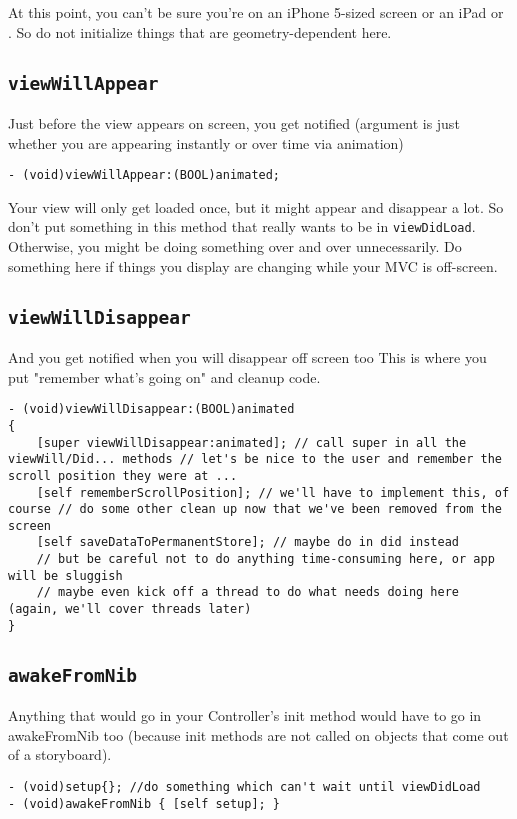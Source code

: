 \documentclass[12pt]{article}
\newcommand{\co}{\texttt}
\begin{document}
At this point, you can't be sure you're on an iPhone 5-sized screen or an iPad or . So do not initialize things that are geometry-dependent here.

\subsection{\co{viewWillAppear}}
Just before the view appears on screen, you get notified (argument is just whether you are appearing instantly or over time via animation)
\begin{lstlisting}
- (void)viewWillAppear:(BOOL)animated;
\end{lstlisting}
Your view will only get loaded once, but it might appear and disappear a lot. So don't put something in this method that really wants to be in \co{viewDidLoad}. Otherwise, you might be doing something over and over unnecessarily. Do something here if things you display are changing while your MVC is off-screen.

\subsection{\co{viewWillDisappear}}
And you get notified when you will disappear off screen too This is where you put "remember what's going on" and cleanup code.
\begin{lstlisting}
- (void)viewWillDisappear:(BOOL)animated
{
	[super viewWillDisappear:animated]; // call super in all the viewWill/Did... methods // let's be nice to the user and remember the scroll position they were at ...
	[self rememberScrollPosition]; // we'll have to implement this, of course // do some other clean up now that we've been removed from the screen
	[self saveDataToPermanentStore]; // maybe do in did instead
	// but be careful not to do anything time-consuming here, or app will be sluggish
	// maybe even kick off a thread to do what needs doing here (again, we'll cover threads later)
}
\end{lstlisting}

\subsection{\co{awakeFromNib}}
Anything that would go in your Controller's init method would have to go in awakeFromNib too (because init methods are not called on objects that come out of a storyboard).

\begin{lstlisting}
- (void)setup{}; //do something which can't wait until viewDidLoad
- (void)awakeFromNib { [self setup]; }
\end{lstlisting}
\end{document}
